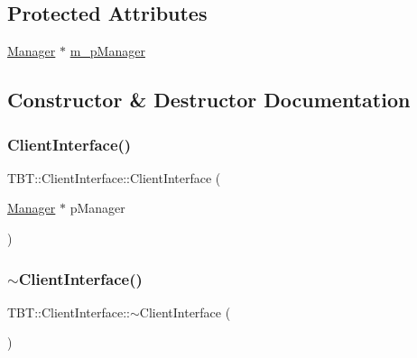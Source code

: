 \subsection*{Protected Attributes}
\begin{DoxyCompactItemize}
\item 
\hyperlink{classTBT_1_1Manager}{Manager} $\ast$ \hyperlink{classTBT_1_1ClientInterface_a1d6558ab5cd2ebcc135e5fc37a1844ba_a1d6558ab5cd2ebcc135e5fc37a1844ba}{m\+\_\+p\+Manager}
\end{DoxyCompactItemize}


\subsection{Constructor \& Destructor Documentation}
\mbox{\label{classTBT_1_1ClientInterface_a77cd35b080e78932f2371ea0f897964b_a77cd35b080e78932f2371ea0f897964b}} 
\subsubsection{\texorpdfstring{Client\+Interface()}{ClientInterface()}}
{\footnotesize\ttfamily T\+B\+T\+::\+Client\+Interface\+::\+Client\+Interface (\begin{DoxyParamCaption}\item[{\hyperlink{classTBT_1_1Manager}{Manager} $\ast$}]{p\+Manager }\end{DoxyParamCaption})}

\mbox{\label{classTBT_1_1ClientInterface_aa42abb5947fa0af75eed777325cbff27_aa42abb5947fa0af75eed777325cbff27}} 
\subsubsection{\texorpdfstring{$\sim$\+Client\+Interface()}{~ClientInterface()}}
{\footnotesize\ttfamily T\+B\+T\+::\+Client\+Interface\+::$\sim$\+Client\+Interface (\begin{DoxyParamCaption}{ }\end{DoxyParamCaption})\hspace{0.3cm}{\ttfamily [virtual]}}



